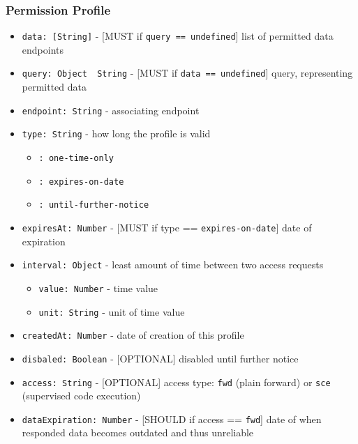 \documentclass[12pt,english,a4paper,titlepage,cleardoublepage=empty,dottedtoc]{report}
\providecommand{\tightlist}{%
  \setlength{\itemsep}{0pt}\setlength{\parskip}{0pt}}
\begin{document}
\hypertarget{permission-profile}{\subsubsection{Permission
Profile}\label{permission-profile}}

\begin{itemize}
\tightlist
\item
  \texttt{data:\ {[}String{]}} - {[}MUST if
  \texttt{query\ ==\ undefined}{]} list of permitted data endpoints
\item
  \texttt{query:\ Object\ \textbar{}\textbar{}\ String} - {[}MUST if
  \texttt{data\ ==\ undefined}{]} query, representing permitted data
\item
  \texttt{endpoint:\ String} - associating endpoint
\item
  \texttt{type:\ String} - how long the profile is valid

  \begin{itemize}
  \tightlist
  \item
    \texttt{:\ one-time-only}
  \item
    \texttt{:\ expires-on-date}
  \item
    \texttt{:\ until-further-notice}
  \end{itemize}
\item
  \texttt{expiresAt:\ Number} - {[}MUST if type ==
  \texttt{expires-on-date\textquotesingle{}}{]} date of expiration
\item
  \texttt{interval:\ Object} - least amount of time between two access
  requests

  \begin{itemize}
  \tightlist
  \item
    \texttt{value:\ Number} - time value
  \item
    \texttt{unit:\ String} - unit of time value
  \end{itemize}
\item
  \texttt{createdAt:\ Number} - date of creation of this profile
\item
  \texttt{disbaled:\ Boolean} - {[}OPTIONAL{]} disabled until further
  notice
\item
  \texttt{access:\ String} - {[}OPTIONAL{]} access type: \texttt{fwd}
  (plain forward) or \texttt{sce} (supervised code execution)
\item
  \texttt{dataExpiration:\ Number} - {[}SHOULD if access ==
  \texttt{\textquotesingle{}fwd\textquotesingle{}}{]} date of when
  responded data becomes outdated and thus unreliable
\end{itemize}
\end{document}
